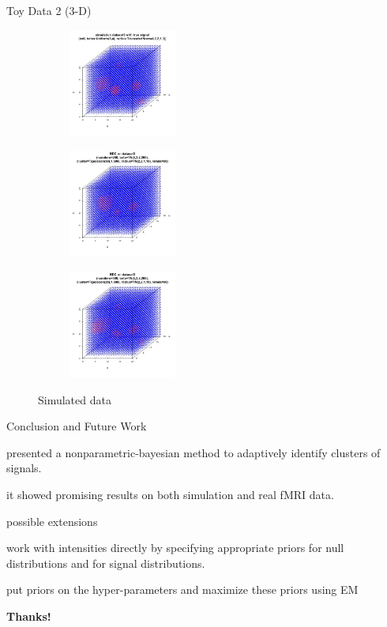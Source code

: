 \documentclass[10pt,mathserif]{beamer}
\begin{document}
\begin{frame}{Toy Data 2 (3-D)}
\begin{figure}[t!]
    \centering
    \begin{subfigure}[t]{0.3\textwidth}
        \centering
        \includegraphics[height=1.4in, width=1.4in]{../simulation_data3.jpg}
        \caption{}
    \end{subfigure}%
    \begin{subfigure}[t]{0.3\textwidth}
        \centering
        \includegraphics[height=1.4in, width=1.4in]{../datase3_poi50.jpg}
        \caption{}
    \end{subfigure}%
        \begin{subfigure}[t]{0.3\textwidth}
        \centering
        \includegraphics[height=1.4in, width=1.4in]{../best3.jpg}
        \caption{}
    \end{subfigure}
    \caption{Simulated data}
\end{figure}
\end{frame}

\begin{frame}{Conclusion and Future Work}
\BIT
\item presented a nonparametric-bayesian method to adaptively identify clusters of signals.
\item it showed promising results on both simulation and real fMRI data.
\item possible extensions
\BIT 
\item work with intensities directly by specifying appropriate priors for null distributions and for signal distributions.
\item put priors on the hyper-parameters and maximize these priors using EM
\EIT  
\EIT
\begin{center}
\textbf{\large Thanks!}
\end{center}
\end{frame}
\end{document}
